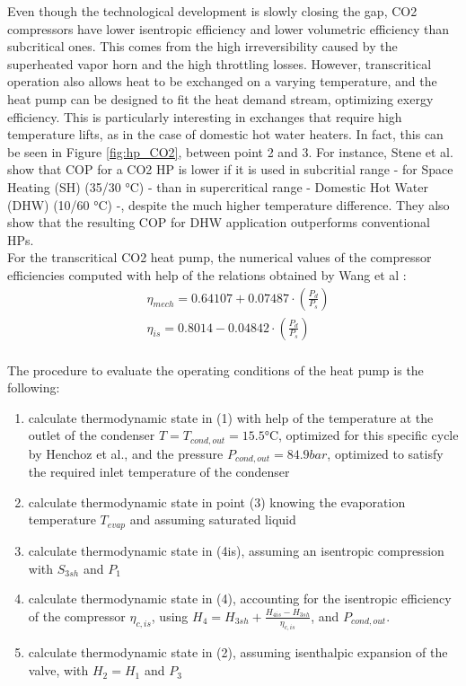 \documentclass{article}
\begin{document}
Even though the technological development is slowly closing the gap, CO2 compressors have lower isentropic efficiency and lower volumetric efficiency than subcritical ones\cite{sarkarSimulationTranscriticalCO22006}. This comes from the high irreversibility caused by the superheated vapor horn and the high throttling losses\cite{yangTheoreticalExperimentalInvestigation2016}. 
However, transcritical operation also allows heat to be exchanged on a varying temperature, and the heat pump can be designed to fit the heat demand stream, optimizing exergy efficiency. This is particularly interesting in exchanges that require high temperature lifts, as in the case of domestic hot water heaters. In fact, this can be seen in Figure \ref{fig:hp_CO2}, between point 2 and 3.  For instance, Stene et al. show that COP for a CO2 HP is lower if it is used in subcritial range - for Space Heating (SH) (35/30 \si{\celsius}) - than in supercritical range - Domestic Hot Water (DHW) (10/60 \si{\celsius}) -, despite the much higher temperature difference. They also show that the resulting COP for DHW application outperforms conventional HPs\cite{steneINTEGRATEDCO2HEAT2007}.\\

For the transcritical CO2 heat pump, the numerical values of the compressor efficiencies computed with help of the relations obtained by Wang et al \cite{wangExperimentalInvestigationAirsource2013}:
\begin{align}
	& \eta_{mech} = 0.64107+0.07487\cdot(\frac{P_{d}}{P_{s}})\\
	& \eta_{is} = 0.8014-0.04842\cdot(\frac{P_{d}}{P_{s}})\\
\end{align}

The procedure to evaluate the operating conditions of the heat pump is the following:
\begin{enumerate}
	\item calculate thermodynamic state in (1) with help of the temperature at the outlet of the condenser $T = T_{cond,out} = 15.5 \si{\celsius}$, optimized for this specific cycle by Henchoz et al.\cite{henchozPerformanceProfitabilityPerspectives2015}, and the pressure $P_{cond,out} = 84.9 bar$, optimized to satisfy the required inlet temperature of the condenser
	\item calculate thermodynamic state in point (3) knowing the evaporation temperature $T_{evap}$ and assuming saturated liquid
	\item calculate thermodynamic state in (4is), assuming an isentropic compression with $S_{3sh}$ and $P_{1}$
	\item calculate thermodynamic state in (4), accounting for the isentropic efficiency of the compressor $\eta_{c,is}$, using $H_{4} = H_{3sh} + \frac{H_{4is} - H_{3sh}}{\eta_{c,is}}$, and $P_{cond,out}$.
	\item calculate thermodynamic state in (2), assuming isenthalpic expansion of the valve, with $H_{2} = H_{1}$ and $P_{3}$
\end{enumerate}
\end{document}
